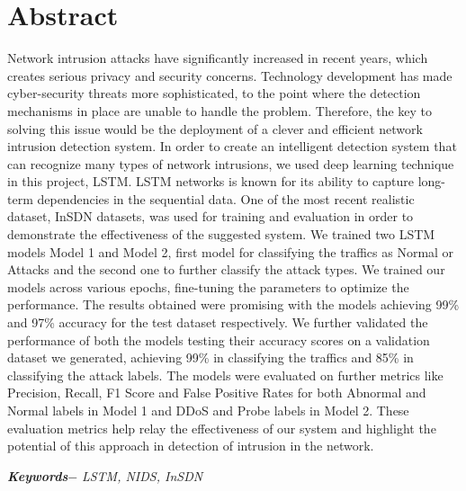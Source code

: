 

\setcounter{tocdepth}{3}
\setcounter{secnumdepth}{3}


\KECcoverpage  
\KECtitlepage
{} %


\KECapproval %

\chapter*{Abstract} %
Network intrusion attacks have significantly increased in recent years, which creates serious privacy and security concerns. Technology development has made cyber-security threats more sophisticated, to the point where the detection mechanisms in place are unable to handle the problem. Therefore, the key to solving this issue would be the deployment of a clever and efficient network intrusion detection system. In order to create an intelligent detection system that can recognize many types of network intrusions, we used deep learning technique in this project, LSTM. LSTM networks is known for its ability to capture long-term dependencies in the sequential data. One of the most recent realistic dataset, InSDN datasets, was used for training and evaluation in order to demonstrate the effectiveness of the suggested system. We trained two LSTM models Model 1 and Model 2, first model for classifying the traffics as Normal or Attacks and the second one to further classify the attack types. We trained our models across various epochs, fine-tuning the parameters to optimize the performance. The results obtained were promising with the models achieving 99\% and 97\% accuracy for the test dataset respectively. We further validated the performance of both the models testing their accuracy scores on a validation dataset we generated, achieving 99\% in classifying the traffics and 85\% in classifying the attack labels. The models were evaluated on further metrics like Precision, Recall, F1 Score and False Positive Rates for both Abnormal and Normal labels in Model 1 and DDoS and Probe labels in Model 2. These evaluation metrics help relay the effectiveness of our system and highlight the potential of this approach in detection of intrusion in the network.
\par
\textbf{\textit{Keywords$-$}} \emph{LSTM, NIDS, InSDN}

